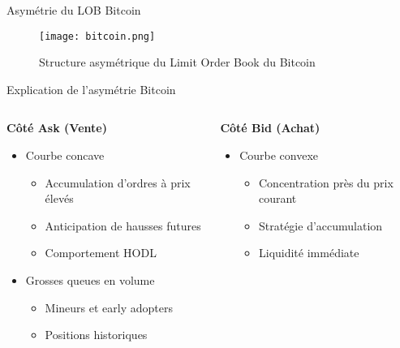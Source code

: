 \documentclass[aspectratio=169]{beamer}  %
\begin{document}
\begin{frame}{Asymétrie du LOB Bitcoin}
    \begin{figure}
        \centering
        \texttt{[image: bitcoin.png]}
        \caption{Structure asymétrique du Limit Order Book du Bitcoin}
    \end{figure}
\end{frame}

\begin{frame}{Explication de l'asymétrie Bitcoin}
    \begin{columns}
        \begin{column}{0.5\textwidth}
            \textbf{Côté Ask (Vente)}
            \begin{itemize}
                \item \small{Courbe concave}
                \begin{itemize}
                    \item \footnotesize{Accumulation d'ordres à prix élevés}
                    \item \footnotesize{Anticipation de hausses futures}
                    \item \footnotesize{Comportement HODL}
                \end{itemize}
                \item \small{Grosses queues en volume}
                \begin{itemize}
                    \item \footnotesize{Mineurs et early adopters}
                    \item \footnotesize{Positions historiques}
                \end{itemize}
            \end{itemize}
        \end{column}
        \begin{column}{0.5\textwidth}
            \textbf{Côté Bid (Achat)}
            \begin{itemize}
                \item \small{Courbe convexe}
                \begin{itemize}
                    \item \footnotesize{Concentration près du prix courant}
                    \item \footnotesize{Stratégie d'accumulation}
                    \item \footnotesize{Liquidité immédiate}
                \end{itemize}

\end{itemize}
\end{column}
\end{columns}
\end{frame}
\end{document}
